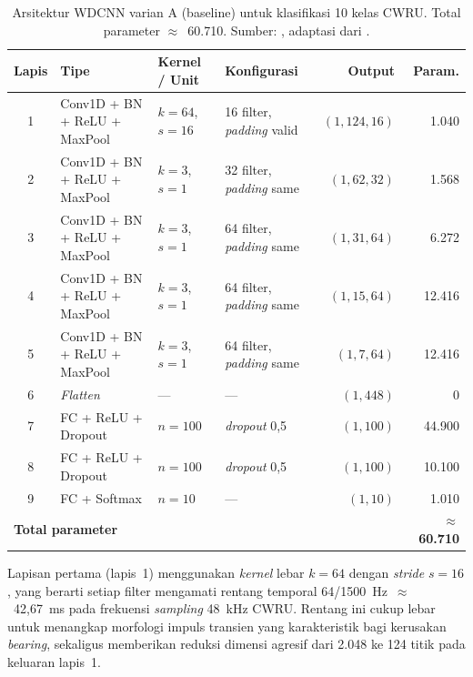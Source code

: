 \begin{table}[ht]
  \centering
  \caption{Arsitektur WDCNN varian A (baseline) untuk klasifikasi
           10 kelas CWRU. Total parameter $\approx$~60.710.
           Sumber: ,
           adaptasi dari .}
  \label{tab:lampG_arsitektur_wdcnn}
  \footnotesize
  \begin{tabularx}{\textwidth}{@{}clXXrr@{}}
    \toprule
    \textbf{Lapis} & \textbf{Tipe} & \textbf{Kernel / Unit} &
    \textbf{Konfigurasi} & \textbf{Output} & \textbf{Param.} \\
    \midrule
    1  & Conv1D + BN + ReLU + MaxPool &
       $k=64$, $s=16$ &
       16 filter, \emph{padding} valid &
       $(1, 124, 16)$ & 1.040 \\
    2  & Conv1D + BN + ReLU + MaxPool &
       $k=3$, $s=1$ &
       32 filter, \emph{padding} same &
       $(1, 62, 32)$ & 1.568 \\
    3  & Conv1D + BN + ReLU + MaxPool &
       $k=3$, $s=1$ &
       64 filter, \emph{padding} same &
       $(1, 31, 64)$ & 6.272 \\
    4  & Conv1D + BN + ReLU + MaxPool &
       $k=3$, $s=1$ &
       64 filter, \emph{padding} same &
       $(1, 15, 64)$ & 12.416 \\
    5  & Conv1D + BN + ReLU + MaxPool &
       $k=3$, $s=1$ &
       64 filter, \emph{padding} same &
       $(1, 7, 64)$ & 12.416 \\
    \midrule
    6  & \emph{Flatten}   & ---   & --- & $(1, 448)$ & 0 \\
    7  & FC + ReLU + Dropout &
       $n=100$ & \emph{dropout} 0,5 &
       $(1, 100)$ & 44.900 \\
    8  & FC + ReLU + Dropout &
       $n=100$ & \emph{dropout} 0,5 &
       $(1, 100)$ & 10.100 \\
    9  & FC + Softmax & $n=10$ & --- & $(1, 10)$ & 1.010 \\
    \midrule
    \multicolumn{5}{l}{\textbf{Total parameter}} & \textbf{$\approx$~60.710} \\
    \bottomrule
  \end{tabularx}
\end{table}

Lapisan pertama (lapis~1) menggunakan \emph{kernel} lebar $k=64$
dengan \emph{stride} $s=16$, yang berarti setiap filter mengamati
rentang temporal 64/1500~Hz~$\approx$~42,67~ms pada frekuensi
\emph{sampling} 48~kHz CWRU. Rentang ini cukup lebar untuk menangkap
morfologi impuls transien yang karakteristik bagi kerusakan \emph{bearing},
sekaligus memberikan reduksi dimensi agresif dari 2.048 ke 124 titik
pada keluaran lapis~1.

